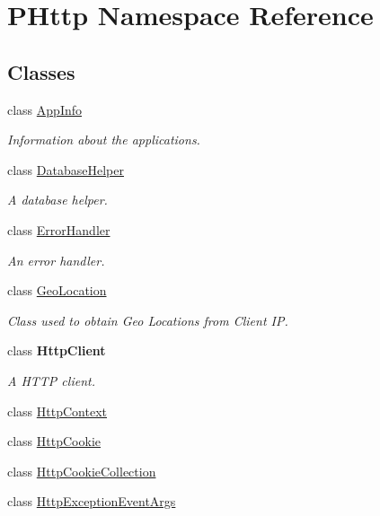 \hypertarget{namespace_p_http}{}\section{P\+Http Namespace Reference}
\label{namespace_p_http}
\subsection*{Classes}
\begin{DoxyCompactItemize}
\item 
class \hyperlink{class_p_http_1_1_app_info}{App\+Info}
\begin{DoxyCompactList}\small\item\em Information about the applications. \end{DoxyCompactList}\item 
class \hyperlink{class_p_http_1_1_database_helper}{Database\+Helper}
\begin{DoxyCompactList}\small\item\em A database helper. \end{DoxyCompactList}\item 
class \hyperlink{class_p_http_1_1_error_handler}{Error\+Handler}
\begin{DoxyCompactList}\small\item\em An error handler. \end{DoxyCompactList}\item 
class \hyperlink{class_p_http_1_1_geo_location}{Geo\+Location}
\begin{DoxyCompactList}\small\item\em Class used to obtain Geo Locations from Client IP. \end{DoxyCompactList}\item 
class {\bfseries Http\+Client}
\begin{DoxyCompactList}\small\item\em A H\+T\+TP client. \end{DoxyCompactList}\item 
class \hyperlink{class_p_http_1_1_http_context}{Http\+Context}
\item 
class \hyperlink{class_p_http_1_1_http_cookie}{Http\+Cookie}
\item 
class \hyperlink{class_p_http_1_1_http_cookie_collection}{Http\+Cookie\+Collection}
\item 
class \hyperlink{class_p_http_1_1_http_exception_event_args}{Http\+Exception\+Event\+Args}
\item 

\end{DoxyCompactItemize}
